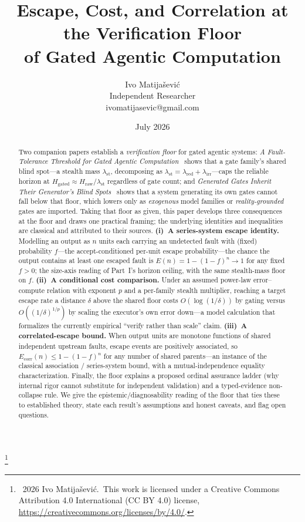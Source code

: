 \documentclass[11pt]{article}
\title{\vspace{-2em}Escape, Cost, and Correlation at the Verification Floor\\
\large of Gated Agentic Computation}
\author{Ivo Matija\v{s}evi\'c\\ \small Independent Researcher \\ \small ivomatijasevic@gmail.com}
\date{July 2026}
\theoremstyle{definition}
\theoremstyle{remark}
\newcommand{\lst}{\lambda_{\mathrm{st}}}
\newcommand{\lred}{\lambda_{\mathrm{red}}}
\newcommand{\lirr}{\lambda_{\mathrm{irr}}}
\newcommand{\Hraw}{H_{\mathrm{raw}}}
\newcommand{\Hgated}{H_{\mathrm{gated}}}
\newcommand{\Esc}{E}
\newcommand{\fesc}{f}
\newcommand\blfootnote[1]{\begingroup\renewcommand\thefootnote{}\footnote{#1}\addtocounter{footnote}{-1}\endgroup}
\begin{document}
\maketitle
\blfootnote{\textcopyright~2026 Ivo Matija\v{s}evi\'c.\ This work is licensed under a Creative Commons
Attribution 4.0 International (CC BY 4.0) license, \url{https://creativecommons.org/licenses/by/4.0/}.}

\begin{abstract}
Two companion papers establish a \emph{verification floor} for gated agentic systems: \emph{A
Fault-Tolerance Threshold for Gated Agentic Computation}~\cite{matijasevic2026n1} shows that a gate
family's shared blind spot---a stealth mass $\lst$, decomposing as $\lst=\lred+\lirr$---caps the
reliable horizon at $\Hgated\approx\Hraw/\lst$ regardless of gate count; and \emph{Generated Gates
Inherit Their Generator's Blind Spots}~\cite{matijasevic2026gg} shows that a system generating its own
gates cannot fall below that floor, which lowers only as \emph{exogenous} model families or
\emph{reality-grounded} gates are imported. Taking that floor as given, this paper develops three
consequences at the floor and draws one practical framing; the underlying identities and inequalities
are classical and attributed to their sources.
\textbf{(i)~A series-system escape identity.} Modelling an output as $n$ units each carrying an
undetected fault with (fixed) probability $\fesc$---the accept-conditioned per-unit escape
probability---the chance the output contains at least one escaped fault is
$\Esc(n)=1-(1-\fesc)^n\to1$ for any fixed $\fesc>0$; the size-axis reading of Part~I's horizon ceiling,
with the same stealth-mass floor on $\fesc$.
\textbf{(ii)~A conditional cost comparison.} Under an assumed power-law error--compute relation with
exponent $p$ and a per-family stealth multiplier, reaching a target escape rate a distance $\delta$
above the shared floor costs $O(\log(1/\delta))$ by gating versus $O((1/\delta)^{1/p})$ by scaling the
executor's own error down---a model calculation that formalizes the currently empirical ``verify rather
than scale'' claim.
\textbf{(iii)~A correlated-escape bound.} When output units are monotone functions of shared independent
upstream faults, escape events are positively associated, so $\Esc_{\mathrm{corr}}(n)\le 1-(1-\fesc)^n$
for any number of shared parents---an instance of the classical association / series-system bound, with
a mutual-independence equality characterization.
Finally, the floor explains a proposed ordinal assurance ladder (why internal rigor cannot substitute
for independent validation) and a typed-evidence non-collapse rule. We give the epistemic/diagnosability
reading of the floor that ties these to established theory, state each result's assumptions and honest
caveats, and flag open questions.
\end{abstract}
\end{document}

